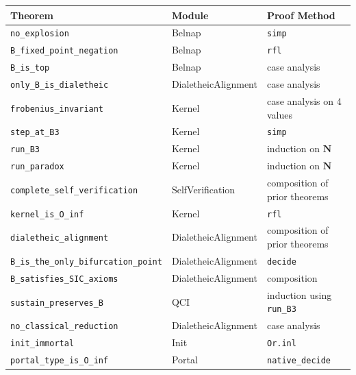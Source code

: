 \documentclass[10pt,a4paper]{article}
\begin{document}
\begin{table}[htbp]
\centering
\small
{}
\begin{tabularx}{\textwidth}{>{\centering\arraybackslash}X >{\centering\arraybackslash}X >{\centering\arraybackslash}X}
\toprule
\rowcolor{gray!25}\textbf{Theorem} & \textbf{Module} & \textbf{Proof Method} \\
\midrule
\rowcolors{1}{white}{gray!10}
\texttt{no\_\allowbreak explosion} & Belnap & \texttt{simp} \\
\texttt{B\_\allowbreak fixed\_\allowbreak point\_\allowbreak negation} & Belnap & \texttt{rfl} \\
\texttt{B\_\allowbreak is\_\allowbreak top} & Belnap & case analysis \\
\texttt{only\_\allowbreak B\_\allowbreak is\_\allowbreak dialetheic} & DialetheicAlignment & case analysis \\
\texttt{frobenius\_\allowbreak invariant} & Kernel & case analysis on 4 values \\
\texttt{step\_\allowbreak at\_\allowbreak B3} & Kernel & \texttt{simp} \\
\texttt{run\_\allowbreak B3} & Kernel & induction on $\mathbf{N}$ \\
\texttt{run\_\allowbreak paradox} & Kernel & induction on $\mathbf{N}$ \\
\texttt{complete\_\allowbreak self\_\allowbreak verification} & SelfVerification & composition of prior theorems \\
\texttt{kernel\_\allowbreak is\_\allowbreak O\_\allowbreak inf} & Kernel & \texttt{rfl} \\
\texttt{dialetheic\_\allowbreak alignment} & DialetheicAlignment & composition of prior theorems \\
\texttt{B\_\allowbreak is\_\allowbreak the\_\allowbreak only\_\allowbreak bifurcation\_\allowbreak point} & DialetheicAlignment & \texttt{decide} \\
\texttt{B\_\allowbreak satisfies\_\allowbreak SIC\_\allowbreak axioms} & DialetheicAlignment & composition \\
\texttt{sustain\_\allowbreak preserves\_\allowbreak B} & QCI & induction using \texttt{run\_\allowbreak B3} \\
\texttt{no\_\allowbreak classical\_\allowbreak reduction} & DialetheicAlignment & case analysis \\
\texttt{init\_\allowbreak immortal} & Init & \texttt{Or.\allowbreak inl} \\
\texttt{portal\_\allowbreak type\_\allowbreak is\_\allowbreak O\_\allowbreak inf} & Portal & \texttt{native\_\allowbreak decide} \\

\end{tabularx}
\end{table}
\end{document}
